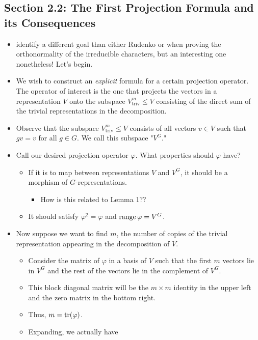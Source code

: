 \documentclass[../notes.tex]{subfiles}
\begin{document}
\subsection*{Section 2.2: The First Projection Formula and its Consequences}
\begin{itemize}
    \item \textcite{bib:FultonHarris} identify a different goal than either Rudenko or \textcite{bib:Serre} when proving the orthonormality of the irreducible characters, but an interesting one nonetheless! Let's begin.
    \item We wish to construct an \emph{explicit} formula for a certain projection operator. The operator of interest is the one that projects the vectors in a representation $V$ onto the subspace $V_\text{triv}^m\leq V$ consisting of the direct sum of the trivial representations in the decomposition.
    \item Observe that the subspace $V_\text{triv}^m\leq V$ consists of all vectors $v\in V$ such that $gv=v$ for all $g\in G$. We call this subspace "$V^G$."
    \item Call our desired projection operator $\varphi$. What properties should $\varphi$ have?
    \begin{itemize}
        \item If it is to map between representations $V$ and $V^G$, it should be a morphism of $G$-representations.
        \begin{itemize}
            \item How is this related to Lemma 1??
        \end{itemize}
        \item It should satisfy $\varphi^2=\varphi$ and $\operatorname{range}\varphi=V^G$.
    \end{itemize}
    \item Now suppose we want to find $m$, the number of copies of the trivial representation appearing in the decomposition of $V$.
    \begin{itemize}
        \item Consider the matrix of $\varphi$ in a basis of $V$ such that the first $m$ vectors lie in $V^G$ and the rest of the vectors lie in the complement of $V^G$.
        \item This block diagonal matrix will be the $m\times m$ identity in the upper left and the zero matrix in the bottom right.
        \item Thus, $m=\tr(\varphi)$.
        \item Expanding, we actually have

\end{itemize}
\end{itemize}
\end{document}
